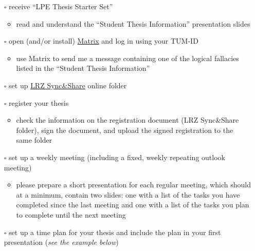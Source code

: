 \documentclass[
  letterpaper,
  DIV=11,
  numbers=noendperiod]{scrartcl}
\providecommand{\tightlist}{%
  \setlength{\itemsep}{0pt}\setlength{\parskip}{0pt}}\usepackage{longtable,booktabs,array}
\begin{document}
\begin{itemize}
\tightlist
\item[$\square$]
  receive ``LPE Thesis Starter Set''

  \begin{itemize}
  \tightlist
  \item
    read and understand the ``Student Thesis Information'' presentation
    slides
  \end{itemize}
\item[$\square$]
  open (and/or install) \href{https://matrix.tum.de/}{Matrix} and log in
  using your TUM-ID

  \begin{itemize}
  \tightlist
  \item
    use Matrix to send me a message containing one of the logical
    fallacies listed in the ``Student Thesis Information''
  \end{itemize}
\item[$\square$]
  set up \href{https://syncandshare.lrz.de/}{LRZ Sync\&Share} online
  folder
\item[$\square$]
  register your thesis

  \begin{itemize}
  \tightlist
  \item
    check the information on the registration document (LRZ Sync\&Share
    folder), sign the document, and upload the signed registration to
    the same folder
  \end{itemize}
\item[$\square$]
  set up a weekly meeting (including a fixed, weekly repeating outlook
  meeting)

  \begin{itemize}
  \tightlist
  \item
    please prepare a short presentation for each regular meeting, which
    should at a minimum, contain two slides: one with a list of the
    tasks you have completed since the last meeting and one with a list
    of the tasks you plan to complete until the next meeting
  \end{itemize}
\item[$\square$]
  set up a time plan for your thesis and include the plan in your first
  presentation (\emph{see the example below})
\end{itemize}
\end{document}
